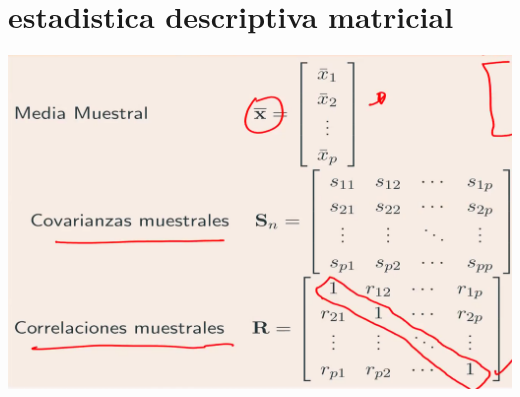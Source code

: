 \documentclass[10pt,a4paper]{article} %
\begin{document}
        \section{estadistica descriptiva matricial}
            \includegraphics[width=0.8\linewidth]{propiedades.png}
            
            
                 
             
            
            
             
            
            
        
    







    
    \nocite{*}
    
    
\end{document}
